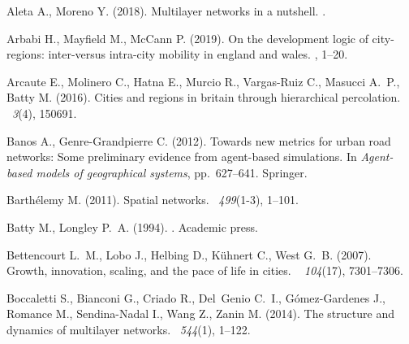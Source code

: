 \documentclass{jimis-en}
\begin{document}
\begin{thebibliography}{}

Aleta A., Moreno Y. (2018).
\newblock Multilayer networks in a nutshell.
.


Arbabi H., Mayfield M., McCann P. (2019).
\newblock On the development logic of city-regions: inter-versus intra-city
  mobility in england and wales.
, 1--20.


Arcaute E., Molinero C., Hatna E., Murcio R., Vargas-Ruiz C., Masucci A.~P.,
  Batty M. (2016).
\newblock Cities and regions in britain through hierarchical percolation.
~{\em 3\/}(4), 150691.


Banos A., Genre-Grandpierre C. (2012).
\newblock Towards new metrics for urban road networks: Some preliminary
  evidence from agent-based simulations.
\newblock In {\em Agent-based models of geographical systems}, pp.\  627--641.
  Springer.


Barth{\'e}lemy M. (2011).
\newblock Spatial networks.
~{\em 499\/}(1-3), 1--101.


Batty M., Longley P.~A. (1994).
.
\newblock Academic press.


Bettencourt L.~M., Lobo J., Helbing D., K{\"u}hnert C., West G.~B. (2007).
\newblock Growth, innovation, scaling, and the pace of life in cities.
~{\em
  104\/}(17), 7301--7306.


Boccaletti S., Bianconi G., Criado R., Del~Genio C.~I., G{\'o}mez-Gardenes J.,
  Romance M., Sendina-Nadal I., Wang Z., Zanin M. (2014).
\newblock The structure and dynamics of multilayer networks.
~{\em 544\/}(1), 1--122.



\end{thebibliography}
\end{document}
